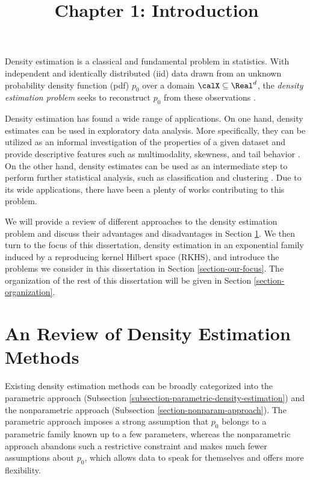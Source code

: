 \documentclass[12pt]{article}
\title{\Large \textbf{Chapter 1: Introduction}}
\author{}
\date{}
\theoremstyle{definition}
\theoremstyle{theorem}
\theoremstyle{remark}
\begin{document}
\thispagestyle{plain}
\maketitle

\tableofcontents


\newpage

Density estimation is a classical and fundamental problem in statistics. With independent and identically distributed (iid) data drawn from an unknown probability density function (pdf) $p_0$ over a domain $\calX \subseteq \Real^d$, the \emph{density estimation problem} seeks to reconstruct $p_0$ from these observations \parencite{Silverman1986-mu}. 

Density estimation has found a wide range of applications. On one hand, density estimates can be used in exploratory data analysis. More specifically, they can be utilized as an informal investigation of the properties of a given dataset and provide descriptive features such as multimodality, skewness, and tail behavior \parencite{Silverman1986-mu, Izenman2009-jk}. On the other hand, density estimates can be used as an intermediate step to perform further statistical analysis, such as classification \parencites{Ripley1996-bi} and clustering \parencites{Fukunaga1975-vy}. Due to its wide applications, there have been a plenty of works contributing to this problem. 

We will provide a review of different approaches to the density estimation problem and discuss their advantages and disadvantages in Section \ref{section-methods}. We then turn to the focus of this dissertation, density estimation in an exponential family induced by a reproducing kernel Hilbert space (RKHS), and introduce the problems we consider in this dissertation in Section \ref{section-our-focus}. The organization of the rest of this dissertation will be given in Section \ref{section-organization}. 

\section{An Review of Density Estimation Methods}\label{section-methods}

Existing density estimation methods can be broadly categorized into the parametric approach (Subsection \ref{subsection-parametric-density-estimation}) and the nonparametric approach (Subsection \ref{section-nonparam-approach}). The parametric approach imposes a strong assumption that $p_0$ belongs to a parametric family known up to a few parameters, %
whereas the nonparametric approach abandons such a restrictive constraint and makes much fewer assumptions about $p_0$, which allows data to speak for themselves and offers more flexibility. 
\end{document}
